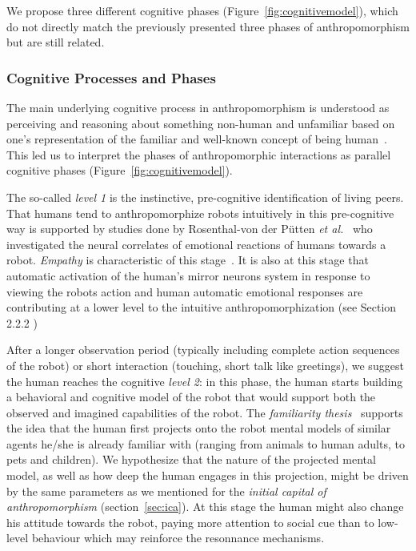 \documentclass{frontiersSCNS} %
\begin{document}
We propose three different cognitive phases (Figure~\ref{fig:cognitivemodel}),
which do not directly match the previously presented three phases of
anthropomorphism but are still related.


\subsubsection{Cognitive Processes and Phases}

The main underlying cognitive process in anthropomorphism is understood as
perceiving and reasoning about something non-human and unfamiliar based on one's
representation of the familiar and well-known concept of being
human~\cite{epley_when_2008}. This led us to interpret the phases of
anthropomorphic interactions as parallel cognitive phases
(Figure~\ref{fig:cognitivemodel}).

The so-called \emph{level 1} is the instinctive, pre-cognitive identification of
living peers. That humans tend to anthropomorphize robots intuitively in this
pre-cognitive way
is supported by studies done by Rosenthal-von der Pütten
\textit{et al.}~\cite{rosenthal-vonderputten_experimental_2013} who investigated
the neural correlates of emotional reactions of humans towards a robot. {\it
Empathy} is characteristic of this stage~\cite{rosenthalvonderPutten2013neural}.
It is also at this stage that automatic activation of the human's mirror neurons
system  in response to viewing the robots action and human automatic emotional
responses are contributing at a lower level
to the intuitive anthropomorphization (see Section 2.2.2 )



After a longer observation period (typically including complete action sequences
of the robot) or short interaction (touching, short talk like greetings), we
suggest the human reaches the cognitive \emph{level 2}: in this phase, the human
starts building a behavioral and cognitive model of the robot that would support
both the observed and imagined capabilities of the robot.  The \emph{familiarity
thesis}~\cite{hegel_understanding_2008} supports the idea that the human
first projects onto the robot mental models of similar agents he/she is already
familiar with (ranging from animals to human adults, to pets and children). We 
hypothesize that the nature of the projected mental
model, as well as how deep the human engages in this projection, might be
driven by the same parameters as we mentioned for the \emph{initial capital of
anthropomorphism} (section~\ref{sec:ica}). 
At this stage the human might also change his attitude towards the robot, paying more attention to social cue than to low-level behaviour which may reinforce the resonnance mechanisms. 
\end{document}
